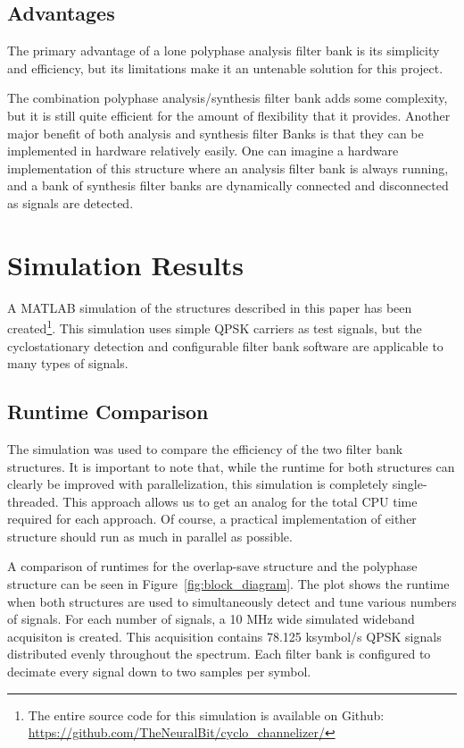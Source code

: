 \documentclass[12pt]{article}
\begin{document}
\subsection{Advantages}
\label{sec:poly_advantages}
The primary advantage of a lone polyphase analysis filter bank is its
simplicity and efficiency, but its limitations make it an untenable solution
for this project.

The combination polyphase analysis/synthesis filter bank adds some complexity,
but it is still quite efficient for the amount of flexibility that it provides.
Another major benefit of both analysis and synthesis filter Banks is that they
can be implemented in hardware relatively easily. One can imagine a hardware
implementation of this structure where an analysis filter bank is always
running, and a bank of synthesis filter banks are dynamically connected and
disconnected as signals are detected.



\section{Simulation Results}
\label{sec:sim}

A MATLAB simulation of the structures described in this paper has been
created\footnote{The entire source code for this simulation is available on
Github: \url{https://github.com/TheNeuralBit/cyclo_channelizer/}}. This
simulation uses simple QPSK carriers as test signals, but the cyclostationary
detection and configurable filter bank software are applicable to many types of
signals.

\subsection{Runtime Comparison}
\label{sec:sim_runtime}

The simulation was used to compare the efficiency of the two filter bank
structures. It is important to note that, while the runtime for both structures
can clearly be improved with parallelization, this simulation is completely
single-threaded. This approach allows us to get an analog for the total CPU
time required for each approach. Of course, a practical implementation of
either structure should run as much in parallel as possible.

A comparison of runtimes for the overlap-save structure and the polyphase
structure can be seen in Figure~\ref{fig:block_diagram}. The plot shows the
runtime when both structures are used to simultaneously detect and tune various
numbers of signals. For each number of signals, a 10 MHz wide simulated
wideband acquisiton is created. This acquisition contains 78.125 ksymbol/s QPSK
signals distributed evenly throughout the spectrum. Each filter bank is
configured to decimate every signal down to two samples per symbol.
\end{document}
